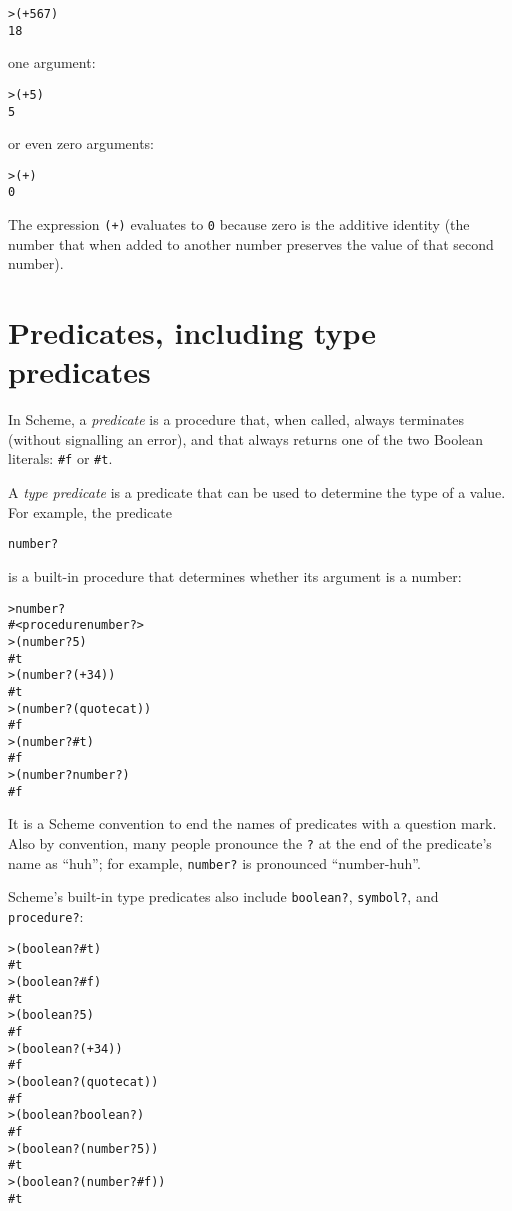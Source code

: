 \documentclass{book}
\begin{document}
\begin{alltt}
> (+ 5 6 7)
18
\end{alltt}

\noindent
one argument:

\begin{alltt}
> (+ 5)
5
\end{alltt}

\noindent
or even zero arguments:

\begin{alltt}
> (+)
0
\end{alltt}

The expression \verb|(+)| evaluates to \verb|0| because zero is the additive identity (the number that when added to another number preserves the value of that second number).

\section{Predicates, including type predicates}

In Scheme, a \emph{predicate} is a procedure that, when called, always terminates (without signalling an error), and that always returns one of the two Boolean literals: \verb|#f| or \verb|#t|.

A \emph{type predicate} is a predicate that can be used to determine the type of a value.  For example, the predicate

\verb|number?|

\noindent
is a built-in procedure that determines whether its argument is a number:

\begin{alltt}
> number?
#<procedure number?>
> (number? 5)
#t
> (number? (+ 3 4))
#t
> (number? (quote cat))
#f
> (number? #t)
#f
> (number? number?)
#f
\end{alltt}

It is a Scheme convention to end the names of predicates with a question mark.
Also by convention, many people pronounce the \verb|?| at the end of the predicate's name as ``huh''; for example, \verb|number?| is pronounced ``number-huh''.

Scheme's built-in type predicates also include \verb|boolean?|, \verb|symbol?|, and \verb|procedure?|:

\begin{alltt}
> (boolean? #t)
#t
> (boolean? #f)
#t
> (boolean? 5)
#f
> (boolean? (+ 3 4))
#f
> (boolean? (quote cat))
#f
> (boolean? boolean?)
#f
> (boolean? (number? 5))
#t
> (boolean? (number? #f))
#t
\end{alltt}
\end{document}
